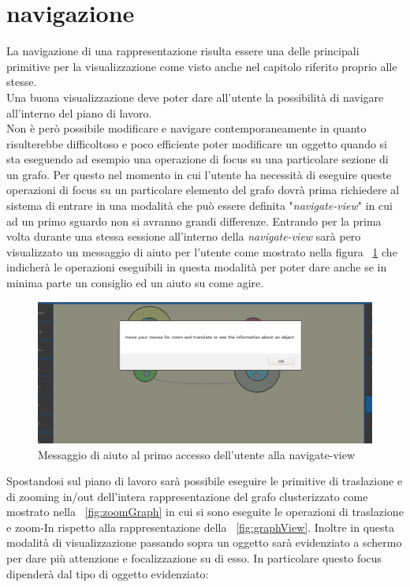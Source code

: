 {\section{navigazione}
La navigazione di una rappresentazione risulta essere una delle principali primitive per la visualizzazione come visto anche nel capitolo riferito proprio alle stesse.\\
Una buona visualizzazione deve poter dare all'utente la possibilità di navigare all'interno del piano di lavoro.\\
Non è però possibile modificare e navigare contemporaneamente in quanto risulterebbe difficoltoso e poco efficiente poter modificare un oggetto quando si sta eseguendo ad esempio una operazione di focus su una particolare sezione di un grafo. Per questo nel momento in cui l'utente ha necessità di eseguire queste operazioni di focus su un particolare elemento del grafo dovrà prima richiedere al sistema di entrare in una modalità che può essere definita "\textit{navigate-view}" in cui ad un primo sguardo non si avranno grandi differenze. Entrando per la prima volta durante una stessa sessione all'interno della \textit{navigate-view} sarà pero visualizzato un messaggio di aiuto per l'utente come mostrato nella figura \figurename~\ref{fig:navMessage} che indicherà le operazioni eseguibili in questa modalità per poter dare anche se in minima parte un consiglio ed un aiuto su come agire.\\
\begin{figure}[!htb]
	\begin{center}
		\includegraphics[width=1 \linewidth]{figure/navMessage}
	\end{center}
	\caption{Messaggio di aiuto al primo accesso dell'utente alla navigate-view\label{fig:navMessage}}
\end{figure}
Spostandosi sul piano di lavoro sarà possibile eseguire le primitive di traslazione e di zooming in/out dell'intera rappresentazione del grafo clusterizzato come mostrato nella \figurename~\ref{fig:zoomGraph} in cui si sono eseguite le operazioni di traslazione e zoom-In rispetto alla rappresentazione della \figurename~\ref{fig:graphView}. Inoltre in questa modalità di visualizzazione passando sopra un oggetto sarà evidenziato a schermo per dare più attenzione e focalizzazione su di esso. In particolare questo focus dipenderà dal tipo di oggetto evidenziato:
}
